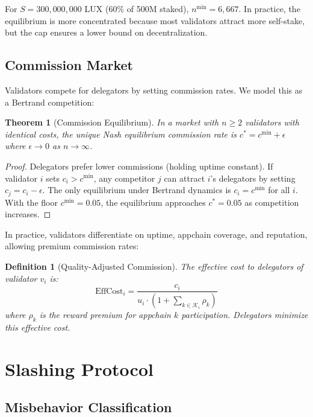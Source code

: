 \documentclass[11pt,a4paper]{article}
\newtheorem{theorem}{Theorem}
\newtheorem{definition}{Definition}
\begin{document}
For $S = 300{,}000{,}000$ LUX (60\% of 500M staked), $n^{\min} = 6{,}667$. In practice, the equilibrium is more concentrated because most validators attract more self-stake, but the cap ensures a lower bound on decentralization.

\subsection{Commission Market}

Validators compete for delegators by setting commission rates. We model this as a Bertrand competition:

\begin{theorem}[Commission Equilibrium]\label{thm:commission}
In a market with $n \geq 2$ validators with identical costs, the unique Nash equilibrium commission rate is $c^* = c^{\min} + \epsilon$ where $\epsilon \to 0$ as $n \to \infty$.
\end{theorem}

\begin{proof}
Delegators prefer lower commissions (holding uptime constant). If validator $i$ sets $c_i > c^{\min}$, any competitor $j$ can attract $i$'s delegators by setting $c_j = c_i - \epsilon$. The only equilibrium under Bertrand dynamics is $c_i = c^{\min}$ for all $i$. With the floor $c^{\min} = 0.05$, the equilibrium approaches $c^* = 0.05$ as competition increases.
\end{proof}

In practice, validators differentiate on uptime, appchain coverage, and reputation, allowing premium commission rates:

\begin{definition}[Quality-Adjusted Commission]
The effective cost to delegators of validator $v_i$ is:
\begin{equation}
    \text{EffCost}_i = \frac{c_i}{u_i \cdot (1 + \sum_{k \in \mathcal{K}_i} \rho_k)}
\end{equation}
where $\rho_k$ is the reward premium for appchain $k$ participation. Delegators minimize this effective cost.
\end{definition}

\section{Slashing Protocol}\label{sec:slashing}

\subsection{Misbehavior Classification}
\end{document}
